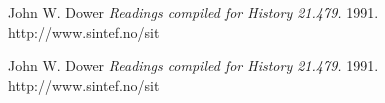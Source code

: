 \begin{thebibliography}{1}

   John W. Dower {\em Readings compiled for History
  21.479.}  1991. http://www.sintef.no/sit
  
     John W. Dower {\em Readings compiled for History
  21.479.}  1991. http://www.sintef.no/sit

 

  \end{thebibliography}